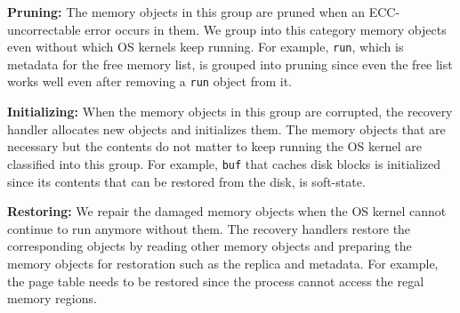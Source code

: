 \noindent
\textbf{Pruning: } The memory objects in this group are pruned when an ECC-uncorrectable error occurs in them. We group into this category memory objects even without which OS kernels keep running. For example, \texttt{run}, which is metadata for the free memory list, is grouped into pruning since even the free list works well even after removing a \texttt{run} object from it.

\noindent
\textbf{Initializing: } When the memory objects in this group are corrupted, the recovery handler allocates new objects and initializes them. The memory objects that are necessary but the contents do not matter to keep running the OS kernel are classified into this group. For example, \texttt{buf} that caches disk blocks is initialized since its contents that can be restored from the disk, is soft-state.

\noindent
\textbf{Restoring: } We repair the damaged memory objects when the OS kernel cannot continue to run anymore without them. The recovery handlers restore the corresponding objects by reading other memory objects and preparing the memory objects for restoration such as the replica and metadata. For example, the page table needs to be restored since the process cannot access the regal memory regions.


